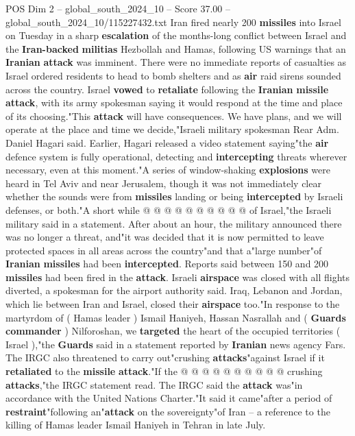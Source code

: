 \begin{textsample}{POS Dim 2 – global\_south\_2024\_10 – Score 37.00 – global\_south\_2024\_10/115227432.txt}  \label{ex:f2_pos_022}
Iran fired nearly 200 \textbf{missiles} into Israel on Tuesday in a sharp \textbf{escalation} of the months-long conflict between Israel and the \textbf{Iran-backed} \textbf{militias} Hezbollah and Hamas, following US warnings that an \textbf{Iranian} \textbf{attack} was imminent.
There were no immediate reports of casualties as Israel ordered residents to head to bomb shelters and as \textbf{air} raid sirens sounded across the country.
Israel \textbf{vowed} to \textbf{retaliate} following the \textbf{Iranian} \textbf{missile} \textbf{attack}, with its army spokesman saying it would respond at the time and place of its choosing."This \textbf{attack} will have consequences.
We have plans, and we will operate at the place and time we decide,"Israeli military spokesman Rear Adm.
Daniel Hagari said.
Earlier, Hagari released a video statement saying"the \textbf{air} defence system is fully operational, detecting and \textbf{intercepting} threats wherever necessary, even at this moment."A series of window-shaking \textbf{explosions} were heard in Tel Aviv and near Jerusalem, though it was not immediately clear whether the sounds were from \textbf{missiles} landing or being \textbf{intercepted} by Israeli defenses, or both."A short while @ @ @ @ @ @ @ @ @ @ of Israel,"the Israeli military said in a statement.
After about an hour, the military announced there was no longer a threat, and"it was decided that it is now permitted to leave protected spaces in all areas across the country"and that a"large number"of \textbf{Iranian} \textbf{missiles} had been \textbf{intercepted}.
Reports said between 150 and 200 \textbf{missiles} had been fired in the \textbf{attack}.
Israeli \textbf{airspace} was closed with all flights diverted, a spokesman for the airport authority said.
Iraq, Lebanon and Jordan, which lie between Iran and Israel, closed their \textbf{airspace} too."In response to the martyrdom of ( Hamas leader ) Ismail Haniyeh, Hassan Nasrallah and ( \textbf{Guards} \textbf{commander} ) Nilforoshan, we \textbf{targeted} the heart of the occupied territories ( Israel ),"the \textbf{Guards} said in a statement reported by \textbf{Iranian} news agency Fars.
The IRGC also threatened to carry out"crushing \textbf{attacks}"against Israel if it \textbf{retaliated} to the \textbf{missile} \textbf{attack}."If the @ @ @ @ @ @ @ @ @ @ crushing \textbf{attacks},"the IRGC statement read.
The IRGC said the \textbf{attack} was"in accordance with the United Nations Charter."It said it came"after a period of \textbf{restraint}"following an"\textbf{attack} on the sovereignty"of Iran -- a reference to the killing of Hamas leader Ismail Haniyeh in Tehran in late July.

\end{textsample}

